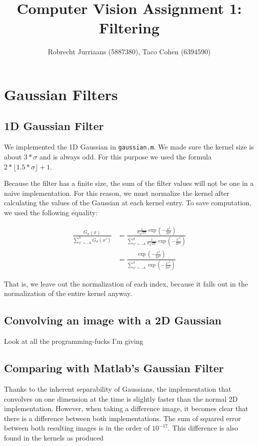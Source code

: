 \documentclass[a4paper,10pt]{article}
\title{Computer Vision Assignment 1: Filtering}
\author{Robrecht Jurriaans (5887380), Taco Cohen (6394590)}
\begin{document}
\maketitle

\section{Gaussian Filters}

\subsection{1D Gaussian Filter}
We implemented the 1D Gaussian in \verb+gaussian.m+.
We made sure the kernel size is about $3*\sigma$ and is always odd.
For this purpose we used the formula $2 * \lfloor 1.5 * \sigma \rfloor + 1$.

Because the filter has a finite size, the sum of the filter values will not be one in a naive implementation.
For this reason, we must normalize the kernel after calculating the values of the Gaussian at each kernel entry.
To save computation, we used the following equality:

\begin{align*}
 \frac{G_{\sigma}(x)}{\sum_{x'=-h}^h G_{\sigma}(x')} &= \frac{ \frac{1}{\sigma \sqrt{2 \pi}} \exp(-\frac{x^2}{2 \sigma^2})}
       {\sum_{x'=-h}^h \frac{1}{\sigma \sqrt{2 \pi}} \exp(-\frac{x'^2}{2 \sigma^2})} \\
&= \frac{ \exp(-\frac{x^2}{2 \sigma^2})}
       {\sum_{x'=-h}^h \exp(-\frac{x'^2}{2 \sigma^2})}
\end{align*}

That is, we leave out the normalization of each index, because it falls out in the normalization of the entire kernel anyway.


\subsection{Convolving an image with a 2D Gaussian}
Look at all the programming-fucks I'm giving

\subsection{Comparing with Matlab's Gaussian Filter}
Thanks to the inherent separability of Gaussians, the implementation that convolves on one dimension at the time is slightly faster than the normal 2D implementation. However, when taking a difference image, it becomes clear that there is a difference between both implementations. The sum of squared error between both resulting images is in the order of $10^{-17}$. This difference is also found in the kernels as produced 
\end{document}
